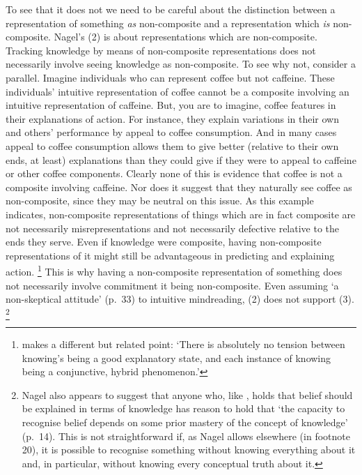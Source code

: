 \documentclass[11pt,a4paper]{extarticle}
\begin{document}
To see that it does not we need  to be careful about the distinction between 
a representation of something \emph{as} non-composite 
and
a representation which \emph{is} non-composite.
Nagel's (2) is about representations which are non-composite.
Tracking knowledge by means of non-composite representations does not necessarily involve seeing  knowledge as non-composite.
To see why not, consider a parallel.
Imagine individuals who can represent coffee but not caffeine.
These individuals' intuitive representation of coffee cannot be a composite involving an intuitive representation of caffeine.
But, you are to imagine, coffee features in their explanations of action.
For instance, they explain variations in their own and others' performance by appeal to coffee consumption.
And in many cases appeal to coffee consumption allows them to give better (relative to their own ends, at least) explanations than they could give if they were to appeal to caffeine or other coffee components.
Clearly none of this is evidence that coffee is not a composite involving caffeine.
Nor does it suggest that they naturally see coffee as non-composite, since they may be neutral on this issue.
As this example indicates, 
non-composite representations of things which are in fact composite are 
not necessarily misrepresentations
and
not necessarily defective relative to the ends they serve.
Even if knowledge were composite, having non-composite representations of it might still be advantageous in predicting and explaining action.%
\footnote{
\citet[p.\ 51]{fricker_2009} makes a different but related point: `There is absolutely no tension between knowing's being a good explanatory state, and each instance of knowing being a conjunctive, hybrid phenomenon.'
}
This is why having a non-composite representation of something does not necessarily involve commitment it being non-composite.
Even assuming `a non-skeptical attitude' (p.\ 33) to intuitive mindreading, (2) does not support (3).%
\footnote{
Nagel also appears to suggest that anyone who, like \citet{Williamson:2000xz}, holds that belief should be explained in terms of knowledge 
has reason to hold that `the capacity to recognise belief depends on some prior mastery of the concept of knowledge' (p.\ 14).
This is not straightforward if, as Nagel allows elsewhere (in footnote 20), it is possible to recognise something without knowing everything about it and, in particular, without knowing every conceptual truth about it. 
}
\end{document}

